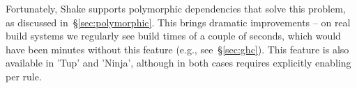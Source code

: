 Fortunately, Shake supports polymorphic dependencies that solve this problem,
as discussed in~\S\ref{sec:polymorphic}. This brings dramatic improvements -- on
real build systems we regularly see build times of a couple of seconds, which
would have been minutes without this feature (e.g., see~\S\ref{sec:ghc}). This
feature is also available in \lst'Tup' and \lst'Ninja', although in both cases
requires explicitly enabling per rule.



% 
% 
% 
% 

